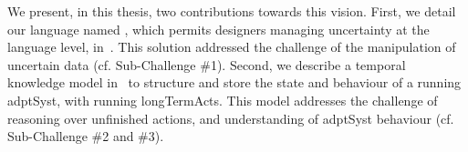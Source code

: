 We present, in this thesis, two contributions towards this vision.
First, we detail our language named \langName{}, which permits designers managing uncertainty at the language level, in~.
This solution addressed the challenge of the manipulation of uncertain data (cf. Sub-Challenge \#1). 
Second, we describe a temporal knowledge model in~ to structure and store the state and behaviour of a running \gls{adptSyst}, with running \glspl{longTermAct}.
This model addresses the challenge of reasoning over unfinished actions, and understanding of \gls{adptSyst} \gls{behaviour} (cf. Sub-Challenge \#2 and \#3).



